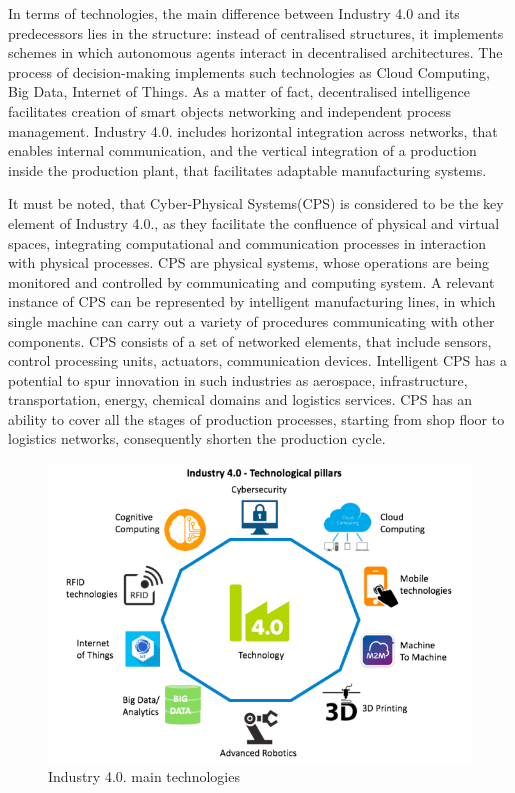 \documentclass[thesis=B,english]{FITthesis}[2019/12/23]
\begin{document}
In terms of technologies, the main difference between Industry 4.0 and its predecessors lies in the structure: instead of centralised structures, it implements schemes in which autonomous agents interact in decentralised architectures. The process of decision-making implements such technologies as Cloud Computing, Big Data, Internet of Things. As a matter of fact, decentralised intelligence facilitates creation of smart objects networking and independent process management. Industry 4.0. includes horizontal integration across networks, that enables internal communication, and the vertical integration of a production inside the production plant, that facilitates adaptable manufacturing systems.

It must be noted, that  Cyber-Physical Systems(CPS) is considered to be the key element of Industry 4.0., as they facilitate the confluence of physical and virtual spaces, integrating computational and communication processes in interaction with physical processes. CPS are physical systems, whose operations are being monitored and controlled by communicating and computing system. A relevant instance of CPS can be represented by intelligent manufacturing lines, in which single machine can carry out a variety of procedures communicating with other components. CPS consists of a set of networked elements, that include sensors, control processing units, actuators, communication devices. Intelligent CPS has a potential to spur innovation in such industries as aerospace, infrastructure, transportation, energy, chemical domains and logistics services. CPS has an ability to cover all the stages of production processes, starting from shop floor to logistics networks, consequently shorten the production cycle. 

\begin{figure}
	\includegraphics[scale=0.4]{Technologies-for-industry-40.png}
	\caption[Industry 4.0 technologies]{Industry 4.0. main technologies}\label{fig:float26}
\end{figure}
\end{document}

